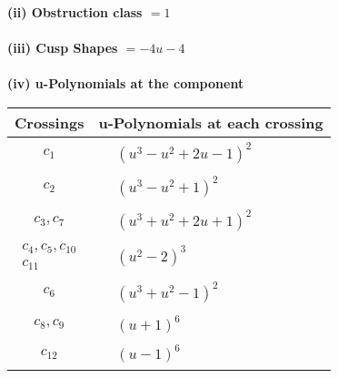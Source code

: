 \documentclass[1p]{elsarticle_modified}
\theoremstyle{definition}
\begin{document}
\flushleft \textbf{(ii) Obstruction class $= 1$}\\~\\
\flushleft \textbf{(iii) Cusp Shapes $= -4 u-4$}\\~\\
\newpage\renewcommand{\arraystretch}{1}
\flushleft \textbf{(iv) u-Polynomials at the component}\newline \\
\begin{tabular}{m{50pt}|m{274pt}}
Crossings & \hspace{64pt}u-Polynomials at each crossing \\
\hline $$\begin{aligned}c_{1}\end{aligned}$$&$\begin{aligned}
&(u^3- u^2+2 u-1)^2
\end{aligned}$\\
\hline $$\begin{aligned}c_{2}\end{aligned}$$&$\begin{aligned}
&(u^3- u^2+1)^2
\end{aligned}$\\
\hline $$\begin{aligned}c_{3},c_{7}\end{aligned}$$&$\begin{aligned}
&(u^3+u^2+2 u+1)^2
\end{aligned}$\\
\hline $$\begin{aligned}c_{4},c_{5},c_{10}\\c_{11}\end{aligned}$$&$\begin{aligned}
&(u^2-2)^3
\end{aligned}$\\
\hline $$\begin{aligned}c_{6}\end{aligned}$$&$\begin{aligned}
&(u^3+u^2-1)^2
\end{aligned}$\\
\hline $$\begin{aligned}c_{8},c_{9}\end{aligned}$$&$\begin{aligned}
&(u+1)^6
\end{aligned}$\\
\hline $$\begin{aligned}c_{12}\end{aligned}$$&$\begin{aligned}
&(u-1)^6
\end{aligned}$\\
\hline
\end{tabular}\\~\\
\end{document}
